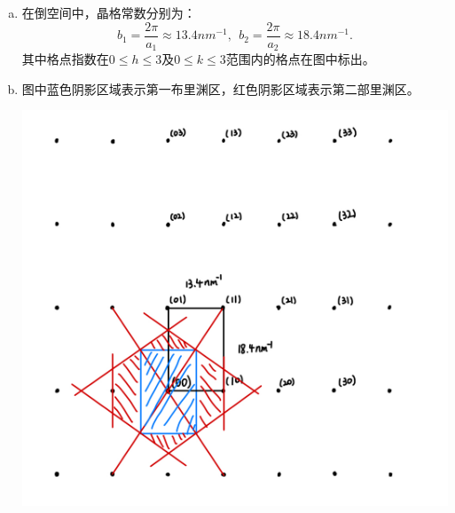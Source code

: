 \documentclass[reqno,a4paper,12pt]{amsart}
\begin{document}
\begin{tcolorbox}[breakable, colback = black!5!white, colframe = black]
\begin{enumerate}[(a)]
\item 在倒空间中，晶格常数分别为：
\[
	b_1 = \frac{2\pi}{a_1} \approx 13.4nm^{-1}, ~~ b_2 = \frac{2\pi}{a_2} \approx 18.4 nm^{-1}.
\]
其中格点指数在$0\leq h \leq 3$及$0\leq k\leq 3$范围内的格点在图中标出。 \\
\item 图中蓝色阴影区域表示第一布里渊区，红色阴影区域表示第二部里渊区。 \\
\begin{centering}
	\includegraphics[scale = 0.192]{13.5.jpeg}
\end{centering}
\end{enumerate}
\end{tcolorbox}
\end{document}
